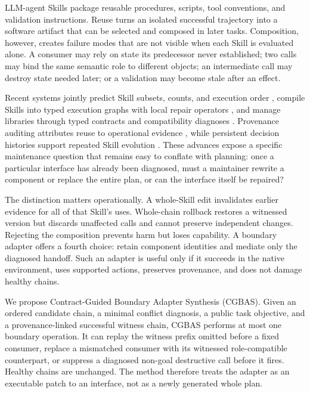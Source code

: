 \documentclass[10pt]{article}
\begin{document}
LLM-agent Skills package reusable procedures, scripts, tool conventions, and
validation instructions. Reuse turns an isolated successful trajectory into a
software artifact that can be selected and composed in later tasks. Composition,
however, creates failure modes that are not visible when each Skill is evaluated
alone. A consumer may rely on state its predecessor never established; two calls
may bind the same semantic role to different objects; an intermediate call may
destroy state needed later; or a validation may become stale after an effect.

Recent systems jointly predict Skill subsets, counts, and execution order
\citep{zhao2026skillcomposer}, compile Skills into typed execution graphs with
local repair operators \citep{xia2026grasp}, and manage libraries through typed
contracts and compatibility diagnoses \citep{pu2026skillops}. Provenance auditing
attributes reuse to operational evidence \citep{chen2026multitrace}, while
persistent decision histories support repeated Skill evolution
\citep{li2026skillhone}. These advances expose a specific maintenance question
that remains easy to conflate with planning: once a particular interface has
already been diagnosed, must a maintainer rewrite a component or replace the
entire plan, or can the interface itself be repaired?

The distinction matters operationally. A whole-Skill edit invalidates earlier
evidence for all of that Skill's uses. Whole-chain rollback restores a witnessed
version but discards unaffected calls and cannot preserve independent changes.
Rejecting the composition prevents harm but loses capability. A boundary adapter
offers a fourth choice: retain component identities and mediate only the diagnosed
handoff. Such an adapter is useful only if it succeeds in the native environment,
uses supported actions, preserves provenance, and does not damage healthy chains.

We propose Contract-Guided Boundary Adapter Synthesis (CGBAS). Given an ordered
candidate chain, a minimal conflict diagnosis, a public task objective, and a
provenance-linked successful witness chain, CGBAS performs at most one boundary
operation. It can replay the witness prefix omitted before a fixed consumer,
replace a mismatched consumer with its witnessed role-compatible counterpart, or
suppress a diagnosed non-goal destructive call before it fires. Healthy chains
are unchanged. The method therefore treats the adapter as an executable patch to
an interface, not as a newly generated whole plan.
\end{document}

